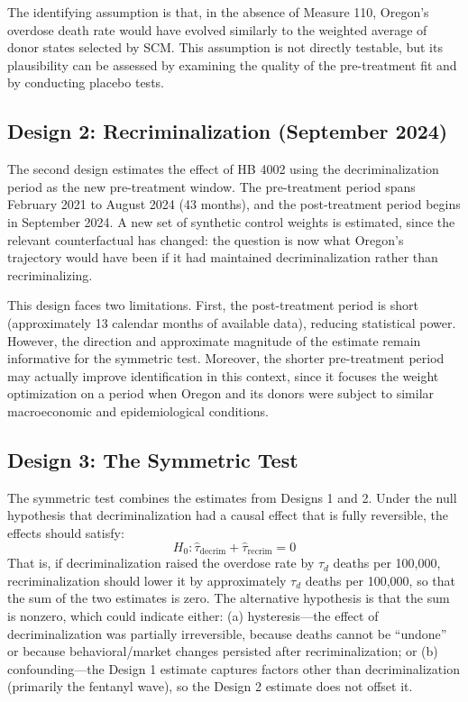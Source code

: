 \documentclass[12pt]{article}
\begin{document}
The identifying assumption is that, in the absence of Measure 110, Oregon's overdose death rate would have evolved similarly to the weighted average of donor states selected by SCM. This assumption is not directly testable, but its plausibility can be assessed by examining the quality of the pre-treatment fit and by conducting placebo tests.

\subsection{Design 2: Recriminalization (September 2024)}

The second design estimates the effect of HB 4002 using the decriminalization period as the new pre-treatment window. The pre-treatment period spans February 2021 to August 2024 (43 months), and the post-treatment period begins in September 2024. A new set of synthetic control weights is estimated, since the relevant counterfactual has changed: the question is now what Oregon's trajectory would have been if it had maintained decriminalization rather than recriminalizing.

This design faces two limitations. First, the post-treatment period is short (approximately 13 calendar months of available data), reducing statistical power. However, the direction and approximate magnitude of the estimate remain informative for the symmetric test. Moreover, the shorter pre-treatment period may actually improve identification in this context, since it focuses the weight optimization on a period when Oregon and its donors were subject to similar macroeconomic and epidemiological conditions.

\subsection{Design 3: The Symmetric Test}

The symmetric test combines the estimates from Designs 1 and 2. Under the null hypothesis that decriminalization had a causal effect that is fully reversible, the effects should satisfy:
\begin{equation}
    H_0: \hat{\tau}_{\text{decrim}} + \hat{\tau}_{\text{recrim}} = 0
    \label{eq:symmetric}
\end{equation}
That is, if decriminalization raised the overdose rate by $\tau_d$ deaths per 100,000, recriminalization should lower it by approximately $\tau_d$ deaths per 100,000, so that the sum of the two estimates is zero. The alternative hypothesis is that the sum is nonzero, which could indicate either: (a) hysteresis---the effect of decriminalization was partially irreversible, because deaths cannot be ``undone'' or because behavioral/market changes persisted after recriminalization; or (b) confounding---the Design 1 estimate captures factors other than decriminalization (primarily the fentanyl wave), so the Design 2 estimate does not offset it.
\end{document}
